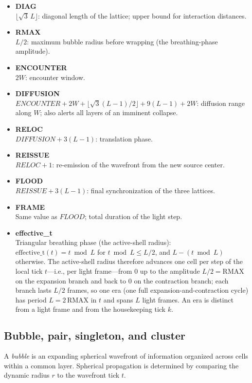 \documentclass[a4paper]{article}
\begin{document}
\begin{itemize}
\item \textbf{DIAG}\\
$\lfloor\sqrt{3}\,L\rfloor$: diagonal length of the lattice; upper bound for interaction distances.
\item \textbf{RMAX}\\
$L/2$: maximum bubble radius before wrapping (the breathing-phase amplitude).
\item \textbf{ENCOUNTER}\\
$2W$: encounter window.
\item \textbf{DIFFUSION} \\
$ENCOUNTER + 2W + \lfloor\sqrt{3}(L-1)/2\rfloor + 9(L-1) + 2W$: diffusion range along $W$; also alerts all layers of an imminent collapse.
\item \textbf{RELOC}\\
$DIFFUSION + 3(L-1)$: translation phase.
\item \textbf{REISSUE}\\
$RELOC + 1$: re-emission of the wavefront from the new source center.
\item \textbf{FLOOD}\\
$REISSUE + 3(L-1)$: final synchronization of the three lattices.
\item \textbf{FRAME}\\
Same value as $FLOOD$; total duration of the light step.
\item \textbf{effective\_t}\\
Triangular breathing phase (the active-shell radius): $\mathrm{effective\_t}(t)=t\bmod L$ for $t\bmod L\le L/2$, and $L-(t\bmod L)$ otherwise.  The active-shell radius therefore advances one cell per step of the local tick $t$---i.e., per light frame---from $0$ up to the amplitude $L/2=\mathrm{RMAX}$ on the expansion branch and back to $0$ on the contraction branch; each branch lasts $L/2$ frames, so one era (one full expansion-and-contraction cycle) has period $L=2\,\mathrm{RMAX}$ in $t$ and spans $L$ light frames.  An era is distinct from a light frame and from the housekeeping tick $k$.
\end{itemize}
\subsection{Bubble, pair, singleton, and cluster} \label{subsec:pairs}
A \emph{bubble} is an expanding spherical wavefront of information organized across cells within a common layer. Spherical propagation is determined by comparing the dynamic radius $r$ to the wavefront tick $t$.
\end{document}
